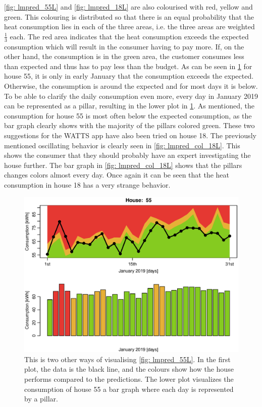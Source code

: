 \noindent \cref{fig: lmpred_55L} and \cref{fig: lmpred_18L} are also colourised with red, yellow and green. This colouring is distributed so that there is an equal probability that the heat consumption lies in each of the three areas, i.e. the three areas are weighted $\frac{1}{3}$ each. The red area indicates that the heat consumption exceeds the expected consumption which will result in the consumer having to pay more. If, on the other hand, the consumption is in the green area, the customer consumes less than expected and thus has to pay less than the budget. As can be seen in \cref{fig: lmpred_col_55L} for house 55, it is only in early January that the consumption exceeds the expected. Otherwise, the consumption is around the expected and for most days it is below. To be able to clarify the daily consumption even more, every day in January 2019 can be represented as a pillar, resulting in the lower plot in \cref{fig: lmpred_col_55L}. As mentioned, the consumption for house 55 is most often below the expected consumption, as the bar graph clearly shows with the majority of the pillars colored green. These two suggestions for the WATTS app have also been tried on house 18. The previously mentioned oscillating behavior is clearly seen in \cref{fig: lmpred_col_18L}. This shows the consumer that they should probably have an expert investigating the house further. The bar graph in \cref{fig: lmpred_col_18L} shows that the pillars changes colors almost every day. Once again it can be seen that the heat consumption in house 18 has a very strange behavior.
\begin{figure}[ht]
    \centering
    \includegraphics[scale=0.6]{../../../figures/Kplot55.eps}
    \caption{This is two other ways of visualising \cref{fig: lmpred_55L}. In the first plot, the data is the black line, and the colours show how the house performs compared to the predictions. The lower plot visualizes the consumption of house 55 a bar graph where each day is represented by a pillar.}
    \label{fig: lmpred_col_55L}
\end{figure}
